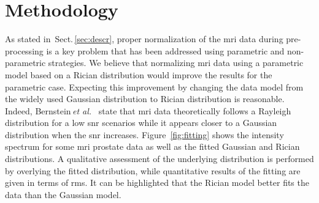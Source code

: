 \section{Methodology}
\label{sec:method}
\graphicspath{ {./content/method/figures/} }


As stated in~Sect.\,\ref{sec:descr}, proper normalization of the \ac{mri} data during pre-processing is a key problem that has been addressed using parametric and non-parametric strategies.
We believe that normalizing \ac{mri} data using a parametric model based on a Rician distribution would improve the results for the parametric case.
Expecting this improvement by changing the data model from the widely used Gaussian distribution to Rician distribution is reasonable. 
Indeed, Bernstein\,\textit{et al.}~\cite{bernstein1989improved} state that \ac{mri} data theoretically follows a Rayleigh distribution for a low \ac{snr} scenarios while it appears closer to a Gaussian distribution when the \ac{snr} increases.
Figure~\ref{fig:fitting} shows the intensity spectrum for some \ac{mri} prostate data as well as the fitted Gaussian and Rician distributions.
A qualitative assessment of the underlying distribution is performed by overlying the fitted distribution, while quantitative results of the fitting are given in terms of \ac{rms}.
It can be highlighted that the Rician model better fits the data than the Gaussian model.

